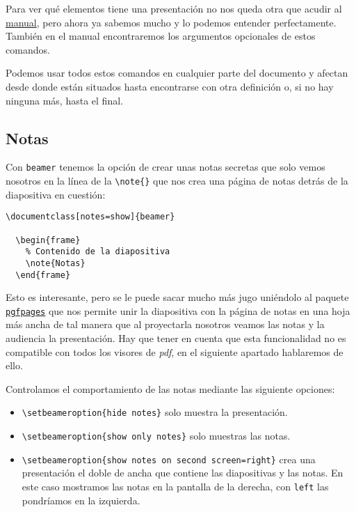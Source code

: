 Para ver qué elementos tiene una presentación no nos queda otra que
acudir al
\href{http://osl.ugr.es/CTAN/macros/latex/contrib/beamer/doc/beameruserguide.pdf}{manual},
pero ahora ya sabemos mucho y lo podemos entender perfectamente. También
en el manual encontraremos los argumentos opcionales de estos comandos.

Podemos usar todos estos comandos en cualquier parte del documento y
afectan desde donde están situados hasta encontrarse con otra definición
o, si no hay ninguna más, hasta el final.

\subsection{Notas}

Con \lstinline!beamer! tenemos la opción de crear unas notas secretas
que solo vemos nosotros en la línea de la
\lstinline!\note{}! que nos crea una página de notas detrás de la
diapositiva en cuestión:

\begin{lstlisting}[language={[latex]tex}]
\documentclass[notes=show]{beamer}

  \begin{frame}
    % Contenido de la diapositiva
    \note{Notas}
  \end{frame}

\end{lstlisting}

Esto es interesante, pero se le puede sacar mucho más jugo uniéndolo al
paquete \href{http://ctan.org/pkg/pgf}{\lstinline!pgfpages!} que nos
permite unir la diapositiva con la página de notas en una hoja más ancha
de tal manera que al proyectarla nosotros veamos las notas y la
audiencia la presentación. Hay que tener en cuenta que esta
funcionalidad no es compatible con todos los visores de \emph{pdf}, en
el siguiente apartado hablaremos de ello.

Controlamos el comportamiento de las notas mediante las siguiente
opciones:

\begin{itemize}
\item
  \lstinline!\setbeameroption{hide notes}! solo muestra la presentación.
\item
  \lstinline!\setbeameroption{show only notes}! solo muestras las notas.
\item
  \lstinline!\setbeameroption{show notes on second screen=right}! crea
  una presentación el doble de ancha que contiene las diapositivas y las
  notas. En este caso mostramos las notas en la pantalla de la derecha,
  con \lstinline!left! las pondríamos en la izquierda.
\end{itemize}

